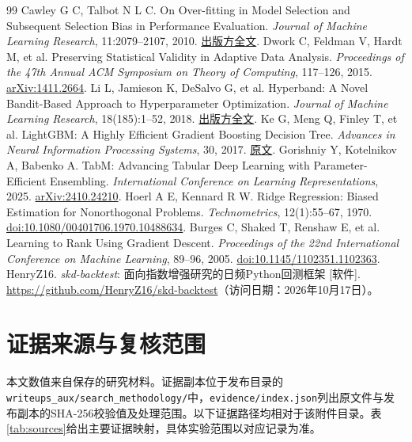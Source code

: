 \documentclass[UTF8,11pt,a4paper,fontset=fandol]{ctexart}
\begin{document}
\begin{thebibliography}{99}\small
\setlength{\itemsep}{1pt}\linespread{1.0}\selectfont
{} Cawley G C, Talbot N L C. On Over-fitting in Model Selection and Subsequent Selection Bias in Performance Evaluation. \emph{Journal of Machine Learning Research}, 11:2079--2107, 2010. \href{https://www.jmlr.org/papers/v11/cawley10a.html}{出版方全文}.
 Dwork C, Feldman V, Hardt M, et al. Preserving Statistical Validity in Adaptive Data Analysis. \emph{Proceedings of the 47th Annual ACM Symposium on Theory of Computing}, 117--126, 2015. \href{https://arxiv.org/abs/1411.2664}{arXiv:1411.2664}.
 Li L, Jamieson K, DeSalvo G, et al. Hyperband: A Novel Bandit-Based Approach to Hyperparameter Optimization. \emph{Journal of Machine Learning Research}, 18(185):1--52, 2018. \href{https://www.jmlr.org/papers/v18/16-558.html}{出版方全文}.
 Ke G, Meng Q, Finley T, et al. LightGBM: A Highly Efficient Gradient Boosting Decision Tree. \emph{Advances in Neural Information Processing Systems}, 30, 2017. \href{https://proceedings.neurips.cc/paper_files/paper/2017/hash/6449f44a102fde848669bdd9eb6b76fa-Abstract.html}{原文}.
 Gorishniy Y, Kotelnikov A, Babenko A. TabM: Advancing Tabular Deep Learning with Parameter-Efficient Ensembling. \emph{International Conference on Learning Representations}, 2025. \href{https://arxiv.org/abs/2410.24210}{arXiv:2410.24210}.
 Hoerl A E, Kennard R W. Ridge Regression: Biased Estimation for Nonorthogonal Problems. \emph{Technometrics}, 12(1):55--67, 1970. \href{https://doi.org/10.1080/00401706.1970.10488634}{doi:10.1080/00401706.1970.10488634}.
 Burges C, Shaked T, Renshaw E, et al. Learning to Rank Using Gradient Descent. \emph{Proceedings of the 22nd International Conference on Machine Learning}, 89--96, 2005. \href{https://doi.org/10.1145/1102351.1102363}{doi:10.1145/1102351.1102363}.
 HenryZ16. \emph{skd-backtest}: 面向指数增强研究的日频Python回测框架 [软件]. \url{https://github.com/HenryZ16/skd-backtest}（访问日期：2026年10月17日）。
\end{thebibliography}

\appendix
\section{证据来源与复核范围}
本文数值来自保存的研究材料。证据副本位于发布目录的\nolinkurl{writeups_aux/search_methodology/}中，\texttt{evidence/index.json}列出原文件与发布副本的SHA-256校验值及处理范围。以下证据路径均相对于该附件目录。表\ref{tab:sources}给出主要证据映射，具体实验范围以对应记录为准。
\end{document}
